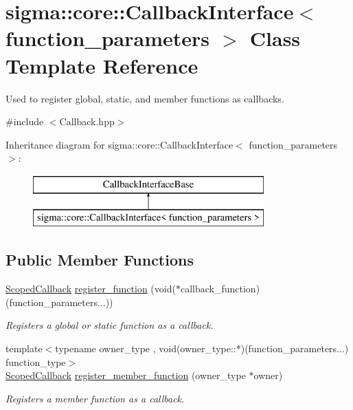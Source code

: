 \hypertarget{classsigma_1_1core_1_1_callback_interface}{\section{sigma\-:\-:core\-:\-:Callback\-Interface$<$ function\-\_\-parameters $>$ Class Template Reference}
\label{classsigma_1_1core_1_1_callback_interface}
}


Used to register global, static, and member functions as callbacks.  




{\ttfamily \#include $<$Callback.\-hpp$>$}

Inheritance diagram for sigma\-:\-:core\-:\-:Callback\-Interface$<$ function\-\_\-parameters $>$\-:\begin{figure}[H]
\begin{center}
\leavevmode
\includegraphics[height=2.000000cm]{classsigma_1_1core_1_1_callback_interface}
\end{center}
\end{figure}
\subsection*{Public Member Functions}
\begin{DoxyCompactItemize}
\item 
\hyperlink{classsigma_1_1core_1_1_scoped_callback}{Scoped\-Callback} \hyperlink{classsigma_1_1core_1_1_callback_interface_a1117c0ac1a539abfe254e2f12dc1880d}{register\-\_\-function} (void($\ast$callback\-\_\-function)(function\-\_\-parameters...))
\begin{DoxyCompactList}\small\item\em Registers a global or static function as a callback. \end{DoxyCompactList}\item 
{\footnotesize template$<$typename owner\-\_\-type , void(owner\-\_\-type\-::$\ast$)(function\-\_\-parameters...) function\-\_\-type$>$ }\\\hyperlink{classsigma_1_1core_1_1_scoped_callback}{Scoped\-Callback} \hyperlink{classsigma_1_1core_1_1_callback_interface_aaa44a699001122a4828013af440345c7}{register\-\_\-member\-\_\-function} (owner\-\_\-type $\ast$owner)
\begin{DoxyCompactList}\small\item\em Registers a member function as a callback. \end{DoxyCompactList}\end{DoxyCompactItemize}
